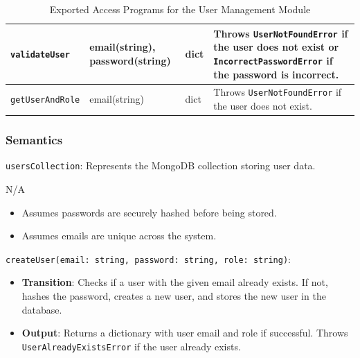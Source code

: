 \documentclass[12pt, titlepage]{article}
\begin{document}
\begin{description}
\begin{description}
\begin{description}
\begin{table}[H]
\begin{tabular}{p{} p{} p{}
    p{}}
    \texttt{validateUser} & email(string), password(string) & dict & Throws
    \texttt{UserNotFoundError} if the user does not exist or
    \texttt{IncorrectPasswordError} if the password is incorrect.\\
    \midrule

    \texttt{getUserAndRole} & email(string) & dict & Throws
    \texttt{UserNotFoundError} if the user does not exist.\\
    \bottomrule

    \end{tabular}
    \caption{Exported Access Programs for the User Management Module}
    \label{TblEAP_UM}
  \end{table}
\end{description}

\subsubsection{Semantics}
\begin{description}
  \item[State Variables:]
  \item
  \texttt{usersCollection}: Represents the MongoDB collection storing user data.
  \item[Environment Variables:]
  \item N/A
  \item[Assumptions:]
  \item
  \begin{itemize}
    \item Assumes passwords are securely hashed before being stored.
  \end{itemize}
  \item
  \begin{itemize}
    \item Assumes emails are unique across the system.
  \end{itemize}

  \item[Access Routine Semantics:] 
  \item
  \texttt{createUser(email: string, password: string, role: string)}:
  \item
  \begin{itemize}
    \item \textbf{Transition}: Checks if a user with the given email already
    exists. If not, hashes the password, creates a new user, and stores the new
    user in the database.
  \end{itemize}
  \item
  \begin{itemize}
    \item \textbf{Output}: Returns a dictionary with user email and role if
    successful. Throws \\
    \texttt{UserAlreadyExistsError} if the user already exists.
  \end{itemize}


\end{description}
\end{description}
\end{description}
\end{document}
